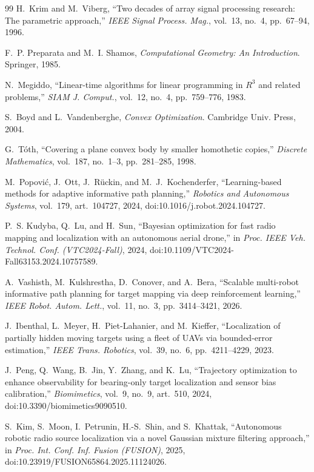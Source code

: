 \documentclass[preprint,12pt,3p]{elsarticle}
\theoremstyle{definition}
\begin{document}
\begin{thebibliography}{99}
H.~Krim and M.~Viberg, ``Two decades of array signal processing research: The parametric
approach,'' \emph{IEEE Signal Process. Mag.}, vol.~13, no.~4, pp.~67--94, 1996.

F.~P. Preparata and M.~I. Shamos, \emph{Computational Geometry: An Introduction}. Springer, 1985.

N.~Megiddo, ``Linear-time algorithms for linear programming in $R^3$ and related problems,''
\emph{SIAM J. Comput.}, vol.~12, no.~4, pp.~759--776, 1983.

S.~Boyd and L.~Vandenberghe, \emph{Convex Optimization}. Cambridge Univ. Press, 2004.

G.~T\'oth, ``Covering a plane convex body by smaller homothetic copies,''
\emph{Discrete Mathematics}, vol.~187, no.~1--3, pp.~281--285, 1998.

M.~Popovi\'c, J.~Ott, J.~R\"uckin, and M.~J.~Kochenderfer, ``Learning-based methods for adaptive
informative path planning,'' \emph{Robotics and Autonomous Systems}, vol.~179, art.~104727, 2024,
doi:10.1016/j.robot.2024.104727.

P.~S. Kudyba, Q.~Lu, and H.~Sun, ``Bayesian optimization for fast radio mapping and
localization with an autonomous aerial drone,'' in \emph{Proc. IEEE Veh. Technol. Conf.
(VTC2024-Fall)}, 2024, doi:10.1109/VTC2024-Fall63153.2024.10757589.

A.~Vashisth, M.~Kulshrestha, D.~Conover, and A.~Bera, ``Scalable multi-robot informative path
planning for target mapping via deep reinforcement learning,'' \emph{IEEE Robot. Autom. Lett.},
vol.~11, no.~3, pp.~3414--3421, 2026.

J.~Ibenthal, L.~Meyer, H.~Piet-Lahanier, and M.~Kieffer, ``Localization of partially hidden
moving targets using a fleet of UAVs via bounded-error estimation,'' \emph{IEEE Trans.
Robotics}, vol.~39, no.~6, pp.~4211--4229, 2023.

J.~Peng, Q.~Wang, B.~Jin, Y.~Zhang, and K.~Lu, ``Trajectory optimization to enhance
observability for bearing-only target localization and sensor bias calibration,''
\emph{Biomimetics}, vol.~9, no.~9, art.~510, 2024, doi:10.3390/biomimetics9090510.

S.~Kim, S.~Moon, I.~Petrunin, H.-S.~Shin, and S.~Khattak, ``Autonomous robotic radio source
localization via a novel Gaussian mixture filtering approach,'' in \emph{Proc. Int. Conf.
Inf. Fusion (FUSION)}, 2025, doi:10.23919/FUSION65864.2025.11124026.

\end{thebibliography}
\end{document}
